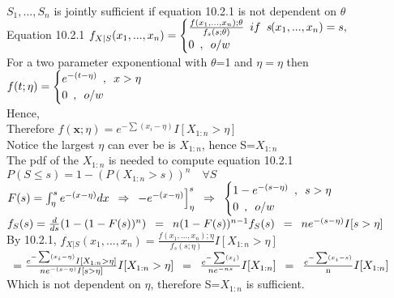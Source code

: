 
\\

$S_1,...,S_n$ is jointly sufficient if equation 10.2.1 is not dependent on $\theta$ \\

Equation 10.2.1 \quad $f_{X|S}(x_1,...,x_n) = \begin{cases} \frac{f(x_1,...,x_n);\theta}{f_s(s;\theta)} \enskip if \enskip \emph{s} (x_1,...,x_n) = s, \\
0\enskip , \enskip o/w \end{cases}$\\
 
For a two parameter exponentional with $\theta$=1 and $\eta = \eta$ then \\

$f(t;\eta)=\begin{cases} e^{-(t-\eta)}\enskip ,\enskip x>\eta  \\
0\enskip ,\enskip o/w \end{cases}$ \\

Hence, \\

Therefore $f(\textbf{x};\eta) = e^{-\sum(x_i - \eta)}I[X_{1:n} >\eta]$ \\

Notice the largest $\eta$ can ever be is $X_{1:n}$, \enskip hence \enskip S=$X_{1:n}$ \\

The pdf of the $X_{1:n}$ is needed to compute equation 10.2.1 \\

$P(S \le s) = 1-(P(X_{1:n} > s))^n \quad \forall S$\\

$F(s) = \int_{\eta}^{s}e^{-(x- \eta )}dx \enskip \Rightarrow \enskip -e^{-(x- \eta)} \Big]_{\eta}^{s} \enskip \Rightarrow \enskip \begin{cases} 1-e^{-(s-\eta)}\enskip ,\enskip s>\eta  \\
0\enskip ,\enskip o/w \end{cases}$\\

$f_S(s) = \frac{d}{ds}(1-(1-F(s))^n) \enskip = \enskip n(1-F(s))^{n-1}f_S(s) \enskip = \enskip ne^{-(s- \eta)}I[s > \eta]$\\

By 10.2.1, \enskip $f_{X|S}(x_1,...,x_n) =\frac{f(x_1,...,x_n);\eta}{f_s(s;\eta)}I[X_{1:n} >\eta]$ \\

$\enskip=\frac{e^{-\sum(x_i - \eta)}I[X_{1:n} >\eta]}{ne^{-(s-\eta)}I[s > \eta]}I[X_{1:n} >\eta] \enskip = \enskip \frac{e^{-\sum(x_i)}}{ne^{-ns}}I[X_{1:n}] \enskip = \enskip \frac{e^{-\sum(x_i - s)}}{\text{n}} I[X_{1:n}]$\\

Which is not dependent on $\eta$, therefore S=$X_{1:n}$ is sufficient.

